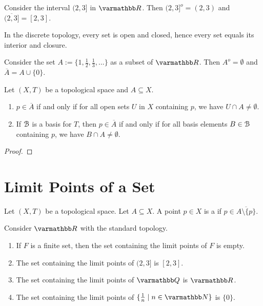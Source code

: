 \begin{example}
    Consider the interval $(2,3]$ in $\bfR$. Then $(2,3]^o = (2,3)$ and $\overline{(2,3]} = [2,3]$.
\end{example}

\begin{example}
    In the discrete topology, every set is open and closed, hence every set equals its interior and closure.
\end{example}

\begin{example}
    Consider the set $A:= \{1,\frac{1}{2}, \frac{1}{3},...\}$ as a subset of $\bfR$. Then $A^o = \emptyset$ and $\overline{A} = A \cup \{0\}$.
\end{example}

\begin{proposition}
    Let $(X,T)$ be a topological space and $A \subseteq X$.
    \phantom{a}
    \begin{enumerate}[label = (\arabic*),itemsep=1pt,topsep=3pt]
        \item $p \in \overline{A}$ if and only if for all open sets $U$ in $X$ containing $p$, we have $U \cap A \neq \emptyset$.
        \item If $\mathcal{B}$ is a basis for $T$, then $p \in \overline{A}$ if and only if for all basis elements $B \in \mathcal{B}$ containing $p$, we have $B \cap A \neq \emptyset$.
    \end{enumerate}
\end{proposition}
    {\color{red} \begin{proof}
        
    \end{proof}}

\section{Limit Points of a Set}

\begin{definition}
    Let $(X,T)$ be a topological space. Let $A \subseteq X$. A point $p \in X$ is a  if $p \in \overline{A \setminus \{p\}}$.
\end{definition}

\begin{example}
    Consider $\bfR$ with the standard topology.
    \begin{enumerate}[label = (\arabic*),itemsep=1pt,topsep=3pt]
        \item If $F$ is a finite set, then the set containing the limit points of $F$ is empty.
        \item The set containing the limit points of $(2,3]$ is $[2,3]$.
        \item The set containing the limit points of $\bfQ$ is $\bfR$.
        \item The set containing the limit points of $\{\frac{1}{n} \mid n \in \bfN\}$ is $\{0\}$.
    \end{enumerate}
\end{example}

